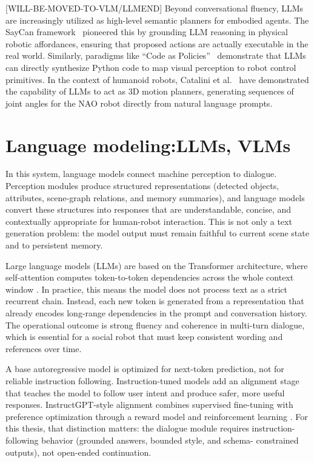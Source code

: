[WILL-BE-MOVED-TO-VLM/LLMEND]
Beyond conversational fluency, LLMs are increasingly utilized as high-level semantic planners for embodied agents. The SayCan framework~\cite{ahn_as_2022} pioneered this by grounding LLM reasoning in physical robotic affordances, ensuring that proposed actions are actually executable in the real world. Similarly, paradigms like ``Code as Policies''~\cite{liang_code_2023} demonstrate that LLMs can directly synthesize Python code to map visual perception to robot control primitives. In the context of humanoid robots, Catalini et al.~\cite{catalini_llms_nodate} have demonstrated the capability of LLMs to act as 3D motion planners, generating sequences of joint angles for the NAO robot directly from natural language prompts.



  \section{Language modeling:\@ LLMs, VLMs}

  In this system, language models connect machine perception to dialogue. Perception modules produce structured representations (detected objects, attributes, scene-graph relations, and memory
  summaries), and language models convert these structures into responses that are understandable, concise, and contextually appropriate for human-robot interaction. This is not only a text generation
  problem: the model output must remain faithful to current scene state and to persistent memory.

  Large language models (LLMs) are based on the Transformer architecture, where self-attention computes token-to-token dependencies across the whole context window \cite{vaswani2023attentionneed}. In
  practice, this means the model does not process text as a strict recurrent chain. Instead, each new token is generated from a representation that already encodes long-range dependencies in the prompt
  and conversation history. The operational outcome is strong fluency and coherence in multi-turn dialogue, which is essential for a social robot that must keep consistent wording and references over
  time.

  A base autoregressive model is optimized for next-token prediction, not for reliable instruction following. Instruction-tuned models add an alignment stage that teaches the model to follow user intent
  and produce safer, more useful responses. InstructGPT-style alignment combines supervised fine-tuning with preference optimization through a reward model and reinforcement learning
  \cite{ouyang2022traininglanguagemodelsfollow}. For this thesis, that distinction matters: the dialogue module requires instruction-following behavior (grounded answers, bounded style, and schema-
  constrained outputs), not open-ended continuation.

